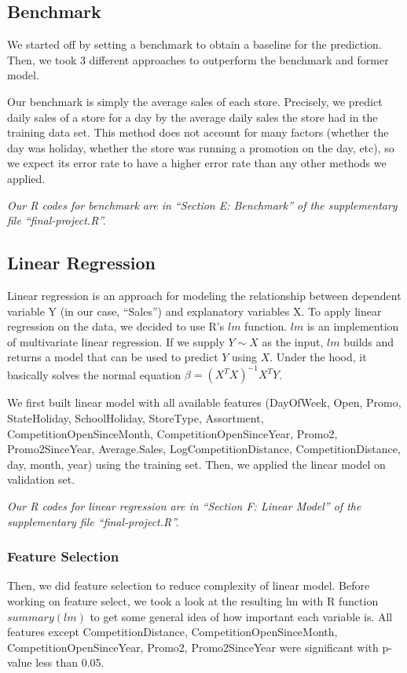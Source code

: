 \documentclass[letterpaper,twocolumn,11pt]{article}
\begin{document}
\subsection{Benchmark}
We started off by setting a benchmark to obtain a baseline for the prediction. Then, we took 3 different approaches to outperform the benchmark and former model.

Our benchmark is simply the average sales of each store. Precisely, we predict daily sales of a store for a day by the average daily sales the store had in the training data set. This method does not account for many factors (whether the day was holiday, whether the store was running a promotion on the day, etc), so we expect its error rate to have a higher error rate than any other methods we applied.

\textit{Our R codes for benchmark are in ``Section E: Benchmark'' of the supplementary file ``final-project.R''.}

\subsection{Linear Regression}
Linear regression is an approach for modeling the relationship between dependent variable Y (in our case, ``Sales'') and explanatory variables X. To apply linear regression on the data, we decided to use R's $lm$ function. $lm$ is an implemention of multivariate linear regression. If we supply $Y \sim X$ as the input, $lm$ builds and returns a model that can be used to predict $Y$ using $X$. Under the hood, it basically solves the normal equation $\beta = (X^T X)^{-1} X^T Y$.

We first built linear model with all available features (DayOfWeek, Open, Promo, StateHoliday, SchoolHoliday, StoreType, Assortment, CompetitionOpenSinceMonth, CompetitionOpenSinceYear, Promo2, Promo2SinceYear, Average.Sales, LogCompetitionDistance, CompetitionDistance, day, month, year) using the training set. Then, we applied the linear model on validation set.

\textit{Our R codes for linear regression are in ``Section F: Linear Model'' of the supplementary file ``final-project.R''.}

\subsubsection{Feature Selection}
Then, we did feature selection to reduce complexity of linear model. Before working on feature select, we took a look at the resulting lm with R function $summary(lm)$ to get some general idea of how important each variable is. All features except CompetitionDistance, CompetitionOpenSinceMonth, CompetitionOpenSinceYear, Promo2, Promo2SinceYear were significant with p-value less than 0.05.
\end{document}
